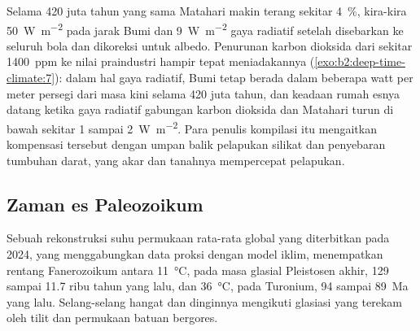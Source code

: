 \begin{omfigure}
\par{}
\end{omfigure}

Selama 420 juta tahun yang sama Matahari makin terang sekitar \qty{4}{\percent}, kira-kira
\qty{50}{W.m^{-2}} pada jarak Bumi dan \qty{9}{W.m^{-2}} gaya radiatif setelah disebarkan ke seluruh
bola dan dikoreksi untuk albedo. Penurunan karbon dioksida dari sekitar \qty{1400}{ppm} ke nilai
praindustri hampir tepat meniadakannya (\cref{exo:b2:deep-time-climate:7}): dalam hal
gaya radiatif, Bumi tetap berada dalam beberapa watt per meter persegi dari masa kini selama 420 juta tahun,
dan keadaan rumah esnya datang ketika gaya radiatif gabungan karbon dioksida dan Matahari turun di bawah sekitar 1
sampai \qty{2}{W.m^{-2}}. Para penulis kompilasi itu mengaitkan kompensasi tersebut dengan umpan balik pelapukan
silikat dan penyebaran tumbuhan darat, yang akar dan tanahnya mempercepat pelapukan.

\subsection*{Zaman es Paleozoikum}

Sebuah rekonstruksi suhu permukaan rata-rata global yang diterbitkan pada 2024, yang menggabungkan data proksi
dengan model iklim, menempatkan rentang Fanerozoikum antara \qty{11}{\celsius}, pada masa glasial
Pleistosen akhir, 129 sampai 11.7 ribu tahun yang lalu, dan \qty{36}{\celsius}, pada Turonium, 94 sampai \qty{89}{Ma} yang lalu.
Selang-selang hangat dan dinginnya mengikuti glasiasi yang terekam oleh tilit dan permukaan batuan bergores.

